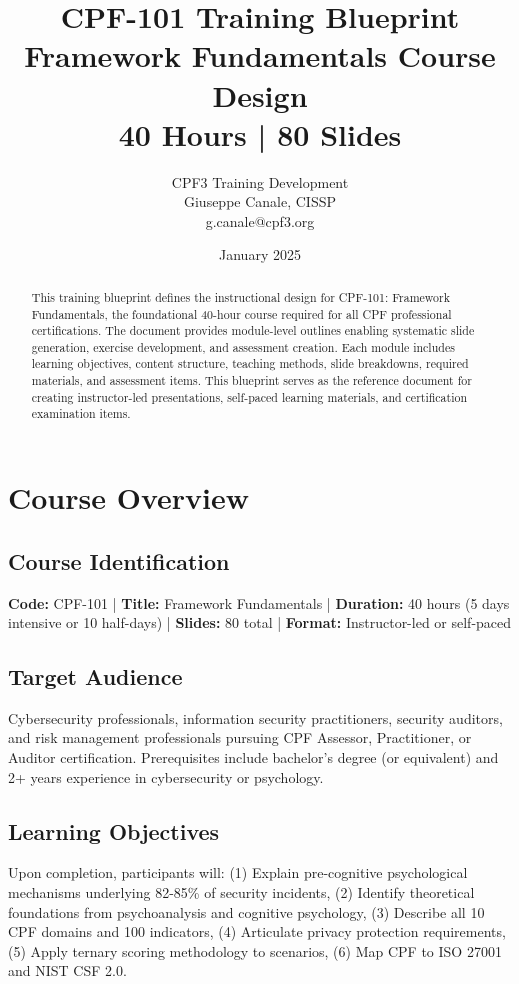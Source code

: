 \documentclass[11pt,a4paper]{article}
\title{\textbf{CPF-101 Training Blueprint}\\
\large Framework Fundamentals Course Design\\
40 Hours | 80 Slides}
\author{CPF3 Training Development\\
Giuseppe Canale, CISSP\\
\small g.canale@cpf3.org}
\date{January 2025}
\begin{document}
\maketitle

\begin{abstract}
This training blueprint defines the instructional design for CPF-101: Framework Fundamentals, the foundational 40-hour course required for all CPF professional certifications. The document provides module-level outlines enabling systematic slide generation, exercise development, and assessment creation. Each module includes learning objectives, content structure, teaching methods, slide breakdowns, required materials, and assessment items. This blueprint serves as the reference document for creating instructor-led presentations, self-paced learning materials, and certification examination items.
\end{abstract}

\tableofcontents
\newpage

\section{Course Overview}

\subsection{Course Identification}
\textbf{Code:} CPF-101 | \textbf{Title:} Framework Fundamentals | \textbf{Duration:} 40 hours (5 days intensive or 10 half-days) | \textbf{Slides:} 80 total | \textbf{Format:} Instructor-led or self-paced

\subsection{Target Audience}
Cybersecurity professionals, information security practitioners, security auditors, and risk management professionals pursuing CPF Assessor, Practitioner, or Auditor certification. Prerequisites include bachelor's degree (or equivalent) and 2+ years experience in cybersecurity or psychology.

\subsection{Learning Objectives}
Upon completion, participants will: (1) Explain pre-cognitive psychological mechanisms underlying 82-85\% of security incidents, (2) Identify theoretical foundations from psychoanalysis and cognitive psychology, (3) Describe all 10 CPF domains and 100 indicators, (4) Articulate privacy protection requirements, (5) Apply ternary scoring methodology to scenarios, (6) Map CPF to ISO 27001 and NIST CSF 2.0.
\end{document}
